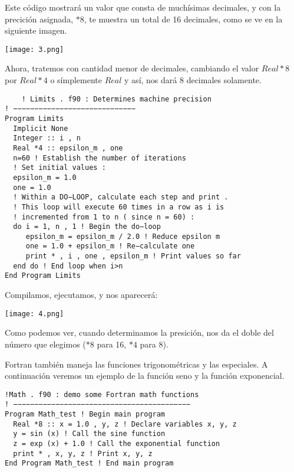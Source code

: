 \documentclass[12pt]{article}
\begin{document}
Este código mostrará un valor que consta de muchísimas decimales, y con la precición asignada, $*8$, te muestra un total de 16 decimales, como se ve en la siguiente imagen.

\begin{center}
\texttt{[image: 3.png]}\\
\end{center}

Ahora, tratemos con cantidad menor de decimales, cambiando el valor $Real *8$ por $Real *4$ o símplemente $Real$ y así, nos dará 8 decimales solamente.

\begin{verbatim}
	! Limits . f90 : Determines machine precision
! −−−−−−−−−−−−−−−−−−−−−−−−−−−−−
Program Limits
  Implicit None
  Integer :: i , n
  Real *4 :: epsilon_m , one
  n=60 ! Establish the number of iterations
  ! Set initial values :
  epsilon_m = 1.0
  one = 1.0
  ! Within a DO−LOOP, calculate each step and print .
  ! This loop will execute 60 times in a row as i is
  ! incremented from 1 to n ( since n = 60) :
  do i = 1, n , 1 ! Begin the do−loop
     epsilon_m = epsilon_m / 2.0 ! Reduce epsilon m
     one = 1.0 + epsilon_m ! Re−calculate one
     print * , i , one , epsilon_m ! Print values so far
  end do ! End loop when i>n
End Program Limits 
\end{verbatim}

Compilamos, ejecutamos, y nos aparecerá:

\begin{center}
\texttt{[image: 4.png]}\\
\end{center}

Como podemos ver, cuando determinamos la presición, nos da el doble del número que elegimos ($*8$ para 16, $*4$ para 8).

	Fortran también maneja las funciones trigonométricas y las especiales. A continuación veremos un ejemplo de la función seno y la función exponencial.

\begin{verbatim}
!Math . f90 : demo some Fortran math functions
! −−−−−−−−−−−−−−−−−−−−−−−−−−−−−−−−−−−−−−−−−−
Program Math_test ! Begin main program
  Real *8 :: x = 1.0 , y, z ! Declare variables x, y, z
  y = sin (x) ! Call the sine function
  z = exp (x) + 1.0 ! Call the exponential function
  print * , x, y, z ! Print x, y, z
End Program Math_test ! End main program 
\end{verbatim}
\end{document}
